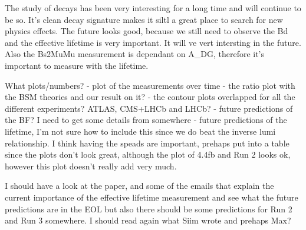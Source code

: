 The study of \bmumu decays has been very interesting for a long time and will continue to be so. It's clean decay signature makes it siltl a great place to search for new physics effects. The future looks good, because we still need to observe the Bd and the effective lifetime is very important. It will ve vert intersting in the future. Also the Bs2MuMu measurement is dependant on A_DG, therefore it's important to measure with the lifetime.



What plots/numbers?
- plot of the measurements over time
- the ratio plot with the BSM theories and our result on it?
- the contour plots overlapped for all the different experiments? ATLAS, CMS+LHCb and LHCb?
- future predictions of the BF? I need to get some details from somewhere
- future predictions of the lifetime, I'm not sure how to include this since we do beat the inverse lumi relationship. I think having the speads are important, prehaps put into a table since the plots don't look great, although the plot of 4.4fb and Run 2 looks ok, however this plot doesn't really add very much. 

I should have a look at the paper, and some of the emails that explain the current importance of the effective lifetime measurement and see what the future predictions are in the EOL but also there should be some predictions for Run 2 and Run 3 somewhere. I should read again what Siim wrote and prehaps Max?
